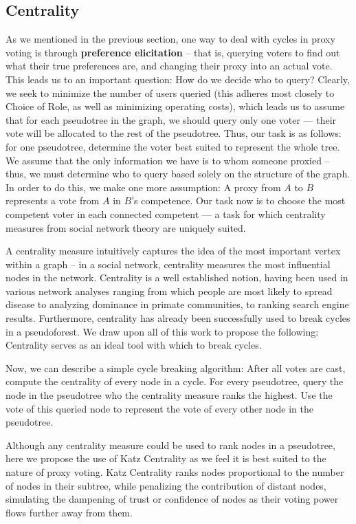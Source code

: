 \documentclass[10pt]{article}
\theoremstyle{definition}
\begin{document}
\subsection{Centrality}

As we mentioned in the previous section, one way to deal with cycles in proxy voting is through \textbf{preference elicitation} -- that is, querying voters to find out what their true preferences are, and changing their proxy into an actual vote. This leads us to an important question: How do we decide who to query? Clearly, we seek to minimize the number of users queried (this adheres most closely to Choice of Role, as well as minimizing operating costs), which leads us to assume that for each pseudotree in the graph, we should query only one voter --- their vote will be allocated to the rest of the pseudotree. Thus, our task is as follows: for one pseudotree, determine the voter best suited to represent the whole tree. We assume that the only information we have is to whom someone proxied -- thus, we must determine who to query based solely on the structure of the graph. In order to do this, we make one more assumption: A proxy from $A$ to $B$ represents a vote from $A$ in $B$'s competence. Our task now is to choose the most competent voter in each connected competent --- a task for which centrality measures from social network theory are uniquely suited.

A centrality measure intuitively captures the idea of the most important vertex within a graph -- in a social network, centrality measures the most influential nodes in the network.\cite{centrality}\cite{cwiki} Centrality is a well established notion, having been used in various network analyses ranging from which people are most likely to spread disease to analyzing dominance in primate communities, to ranking search engine results. Furthermore, centrality has already been successfully used to break cycles in a pseudoforest.\cite{wikipedia} We draw upon all of this work to propose the following: Centrality serves as an ideal tool with which to break cycles. 

Now, we can describe a simple cycle breaking algorithm: After all votes are cast, compute the centrality of every node in a cycle. For every pseudotree, query the node in the pseudotree who the centrality measure ranks the highest. Use the vote of this queried node to represent the vote of every other node in the pseudotree.

Although any centrality measure could be used to rank nodes in a pseudotree, here we propose the use of Katz Centrality as we feel it is best suited to the nature of proxy voting. Katz Centrality ranks nodes proportional to the number of nodes in their subtree, while penalizing the contribution of distant nodes, simulating the dampening of trust or confidence of nodes as their voting power flows further away from them.
\end{document}
